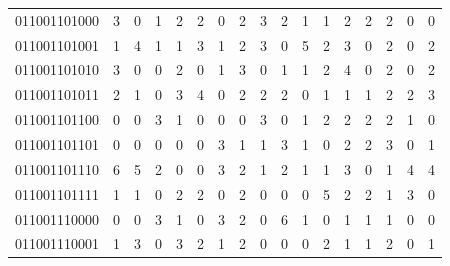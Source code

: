 \documentclass[10pt,a4paper]{article}
\begin{document}
\begin{longtable}{ |c|c|c|c|c|c|c|c|c|c|c|c|c|c|c|c|c| }
    011001101000              & 3                            & 0                                & 1                            & 2                              & 2   & 0   & 2   & 3   & 2   & 1   & 1   & 2   & 2   & 2   & 0   & 0   \\
    011001101001              & 1                            & 4                                & 1                            & 1                              & 3   & 1   & 2   & 3   & 0   & 5   & 2   & 3   & 0   & 2   & 0   & 2   \\
    011001101010              & 3                            & 0                                & 0                            & 2                              & 0   & 1   & 3   & 0   & 1   & 1   & 2   & 4   & 0   & 2   & 0   & 2   \\
    011001101011              & 2                            & 1                                & 0                            & 3                              & 4   & 0   & 2   & 2   & 2   & 0   & 1   & 1   & 1   & 2   & 2   & 3   \\
    011001101100              & 0                            & 0                                & 3                            & 1                              & 0   & 0   & 0   & 3   & 0   & 1   & 2   & 2   & 2   & 2   & 1   & 0   \\
    011001101101              & 0                            & 0                                & 0                            & 0                              & 0   & 3   & 1   & 1   & 3   & 1   & 0   & 2   & 2   & 3   & 0   & 1   \\
    011001101110              & 6                            & 5                                & 2                            & 0                              & 0   & 3   & 2   & 1   & 2   & 1   & 1   & 3   & 0   & 1   & 4   & 4   \\
    011001101111              & 1                            & 1                                & 0                            & 2                              & 2   & 0   & 2   & 0   & 0   & 0   & 5   & 2   & 2   & 1   & 3   & 0   \\
    011001110000              & 0                            & 0                                & 3                            & 1                              & 0   & 3   & 2   & 0   & 6   & 1   & 0   & 1   & 1   & 1   & 0   & 0   \\
    011001110001              & 1                            & 3                                & 0                            & 3                              & 2   & 1   & 2   & 0   & 0   & 0   & 2   & 1   & 1   & 2   & 0   & 1   \\

\end{longtable}
\end{document}
